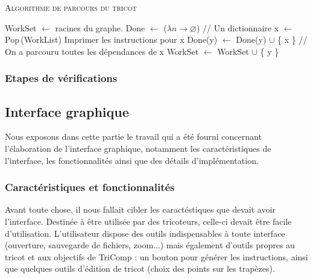 \documentclass{article}
\begin{document}
\begin{algorithm}\label{algo}
\caption{\textsc{Algorithme de parcours du tricot}}
\begin{algorithmic}[1]
\State WorkSet $\leftarrow$ racines du graphe.
\State Done $\leftarrow$ ($\lambda n \to \varnothing$) // Un dictionnaire
  \State x $\leftarrow$ Pop\,(WorkList)
  \State Imprimer les instructions pour x
    \State Done(y) $\leftarrow$ Done(y) $\cup$ \{ x \}
     // On a parcouru toutes les dépendances de x
      \State WorkSet $\leftarrow$ WorkSet $\cup$ \{ y \}
    \EndIf
  \EndFor


\EndWhile

\end{algorithmic}
\end{algorithm}

\subsubsection{Etapes de vérifications}

\subsection{Interface graphique}

Nous exposons dans cette partie le travail qui a été fourni concernant
l'élaboration de l'interface graphique, notamment les caractéristiques
de l'interface, les fonctionnalités ainsi que des détails
d'implémentation.

\subsubsection{Caractéristiques et fonctionnalités}

Avant toute chose, il nous fallait cibler les caractéstiques que
devait avoir l'interface. Destinée à être utilisée par des tricoteurs,
celle-ci devait être facile d'utilisation. L'utilisateur dispose des
outils indispensables à toute interface (ouverture, sauvegarde de
fichiers, zoom...) mais également d'outils propres au tricot et aux
objectifs de TriComp : un bouton pour générer les instructions, ainsi
que quelques outils d'édition de tricot (choix des points sur les
trapèzes).
\end{document}
